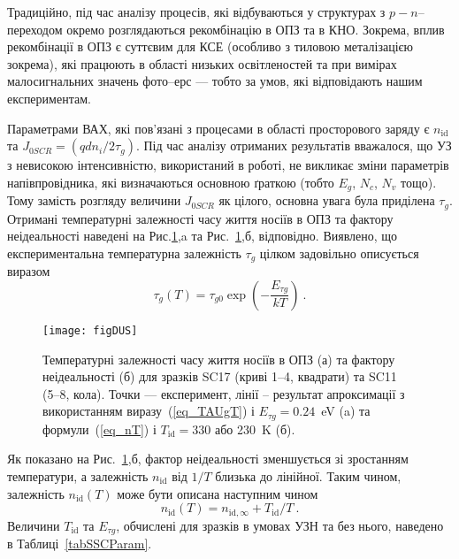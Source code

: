 Традиційно, під час аналізу процесів, які відбуваються у структурах з $p-n$--переходом окремо розглядаються рекомбінацію в ОПЗ та в КНО.
Зокрема, вплив рекомбінації в ОПЗ є суттєвим для КСЕ (особливо з тиловою металізацією зокрема), які працюють в області низьких
освітленостей та при вимірах малосигнальних значень фото--ерс \cite{Sach:UPJ2016} --- тобто за умов, які відповідають нашим експериментам.


Параметрами ВАХ, які пов'язані з процесами в області просторового заряду є $n_{\mathrm{id}}$ та $J_{0SCR}=(qdn_i/2\tau_{g})$.
Під час аналізу отриманих результатів вважалося, що УЗ з невисокою інтенсивністю, використаний в роботі, не
викликає зміни параметрів напівпровідника, які визначаються основною ґраткою (тобто  $E_g$, $N_c$, $N_v$ тощо).
Тому замість розгляду величини $J_{0SCR}$ як цілого, основна увага була приділена $\tau_{g}$.
Отримані температурні залежності часу життя носіїв в ОПЗ та фактору неідеальності наведені на Рис.\ref{figDUS},a та Рис.~\ref{figDUS},б, відповідно.
Виявлено, що експериментальна температурна залежність $\tau_{g}$ цілком задовільно описується виразом
\begin{equation}
\label{eq_TAUgT}
    \tau_{g}(T)=\tau_{g0}\exp\left(-\frac{E_{\tau g}}{kT}\right)\:.
\end{equation}

\begin{figure}
\center
\texttt{[image: figDUS]}%
\caption{\label{figDUS}
Температурні залежності часу життя носіїв в ОПЗ (а) та фактору неідеальності (б)
для зразків SC17 (криві 1--4, квадрати) та SC11 (5--8, кола).
\FigCaptionSSC
Точки --- експеримент,
лінії -- результат апроксимації з використанням виразу~(\ref{eq_TAUgT}) і $E_{\tau g}=0.24$~eV (a) та
формули~(\ref{eq_nT}) і $T_\mathrm{id}=330$ або 230~K (б).
}%
\end{figure}

Як показано на Рис.~\ref{figDUS},б, фактор неідеальності зменшується зі зростанням температури, а залежність
$n_{\mathrm{id}}$ від $1/T$  близька до лінійної.
Таким чином, залежність $n_{\mathrm{id}}(T)$ може бути описана наступним чином
\begin{equation}
\label{eq_nT}
    n_{\mathrm{id}}(T)=n_{\mathrm{id},\infty}+T_{\mathrm{id}}/T\:.
\end{equation}
Величини $T_{\mathrm{id}}$ та $E_{\tau g}$, обчислені для зразків в умовах УЗН та без нього, наведено в Таблиці~\ref{tabSSCParam}.


